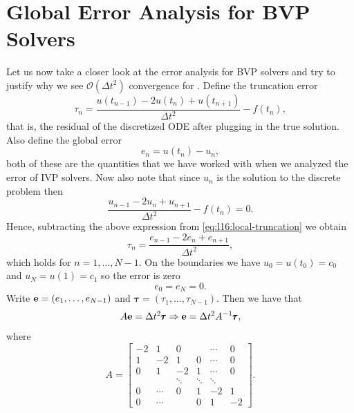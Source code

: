 \chapter{Global Error Analysis for BVP Solvers}

Let us now take a closer look at the error analysis for BVP solvers and try 
to justify why we see $\mathcal{O}(\Delta t^2)$ convergence for 
. Define the truncation error 
\begin{equation}\label{eq:l16:local-truncation}
    \tau_n = \frac{u(t_{n-1}) - 2 u(t_n) + u(t_{n+1})}{\Delta t^2} - f(t_n),
\end{equation}
that is, the residual of the discretized ODE after plugging in the 
true solution. Also define the global error 
\begin{equation*}
    e_n = u(t_n) - u_n,
\end{equation*}
both of these are the quantities that we have worked with when we analyzed 
the error of IVP solvers. Now also note that since $u_n$ is the solution 
to the discrete problem then 
\begin{equation*}
    \frac{u_{n-1} - 2 u_n + u_{n+1}}{\Delta t^2} - f(t_n) = 0.
\end{equation*}
Hence, subtracting the above expression from \eqref{eq:l16:local-truncation}
we obtain 
\begin{equation*}
    \tau_n = \frac{ e_{n-1} - 2 e_n + e_{n+1}}{\Delta t ^2}, 
\end{equation*}
which holds for $n=1, \dots, N-1$. On the boundaries we have $u_0 = u(t_0)
= c_0$ and $u_N = u(1) = c_1$ so the error is zero 
\begin{equation*}
    e_0 = e_N = 0.
\end{equation*}
Write $\mathbf{e} = (e_1, \dots, e_{N-1})$ and $\pmb{\tau} = (\tau_1, \dots, \tau_{N-1})$. 
Then we have that 
\begin{equation*}
    A \mathbf{e} = \Delta t^2 \pmb{\tau} \Rightarrow \mathbf{e} = \Delta t^2 A^{-1} \pmb{\tau}, 
\end{equation*}
where 
\begin{equation*}
    A = \begin{bmatrix}
        -2 & 1 & 0 & & \cdots & 0 \\ 
        1 &  -2 & 1 & 0 & \cdots & 0 \\ 
        0 & 1 & -2 & 1 & \cdots & 0 \\ 
         &  & \ddots & \ddots & \ddots & \\ 
         0 & \cdots & 0 & 1 & -2 & 1 \\ 
         0 & \cdots &   & 0 & 1 & -2
    \end{bmatrix}.
\end{equation*}
